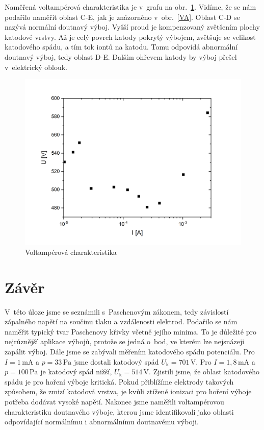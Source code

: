 \documentclass[a4paper,12pt]{article}
\begin{document}
\newpage
Naměřená voltampérová charakteristika je v~grafu na obr.~\ref{VAodpor}. Vidíme, 
že se nám podařilo naměřit oblast C-E, jak je znázorněno v~obr.~\ref{VA}. 
Oblast C-D se nazývá normální doutnavý výboj. Vyšší proud je kompenzovaný 
zvětšením plochy katodové vrstvy. Až je celý povrch katody pokrytý výbojem, 
zvětšuje 
se velikost katodového spádu, a tím tok iontů na katodu. Tomu odpovídá 
abnormální doutnavý výboj, tedy oblast D-E. Dalším ohřevem katody by výboj 
přešel v~elektrický oblouk.

\begin{figure}[h!]
	\centering
	\includegraphics[width=145mm]{VAodpor.png}
	\caption{Voltampérová charakteristika}
	\label{VAodpor}
\end{figure}

\clearpage
\section{Závěr}
V~této úloze jsme se seznámili s~Paschenovým zákonem, tedy závislostí zápalného 
napětí na součinu tlaku a vzdálenosti elektrod. Podařilo se nám naměřit typický 
tvar Paschenovy křivky včetně jejího minima. To je důležité pro nejrůznější 
aplikace výbojů, protože se jedná o~bod, ve kterém lze nejsnázeji zapálit výboj.
Dále jsme se zabývali měřením katodového spádu potenciálu. Pro 
$I = 1\,\si{\milli\ampere}$ a $p = 33\,\si{\pascal}$ jsme dostali katodový spád 
$U_\text{k} = 701\,\si{\volt}$. Pro $I = 1,8\,\si{\milli\ampere}$ a $p = 
100\,\si{\pascal}$ je katodový spád nižší,  $U_\text{k} = 514\,\si{\volt}$. 
Zjistili jsme, že oblast katodového spádu je pro hoření výboje kritická. Pokud 
přiblížíme elektrody takových způsobem, že zmizí katodová vrstva, je kvůli 
ztížené ionizaci pro hoření výboje potřeba dodávat vysoké napětí. Nakonec jsme 
naměřili voltampérovou charakteristiku doutnavého výboje, kterou jsme 
identifikovali jako oblasti odpovídající normálnímu i abnormálnímu doutnavému 
výboji.
\end{document}

